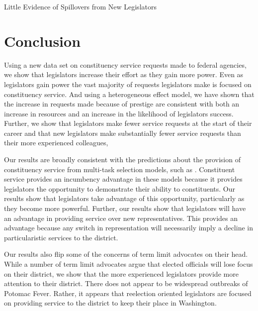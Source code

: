 \documentclass[12pt]{article}
\begin{document}
   

\begin{table}[hbt!]
\caption{Little Evidence of Spillovers from New Legislators} \label{t:spill1}

\begin{minipage}{\textwidth}
\begin{center}

\end{center}
\end{minipage}
\end{table}


\section{Conclusion} \label{s:conclude}

Using a new data set on constituency service requests made to federal agencies, we show that legislators increase their effort as they gain more power. Even as legislators gain power the vast majority of requests legislators make is focused on constituency service. And using a heterogeneous effect model, we have shown that the increase in requests made because of prestige are consistent with both an increase in resources and an increase in the likelihood of legislators success. Further, we show that legislators make fewer service requests at the start of their career and that new legislators make substantially fewer service requests than their more experienced colleagues,  

Our results are broadly consistent with the predictions about the provision of constituency service from multi-task selection models, such as \cite{AshworthBuenodeMesquita2006}. Constituent service provides an incumbency advantage in these models because it provides legislators the opportunity to demonstrate their ability to constituents. Our results show that legislators take advantage of this opportunity, particularly as they become more powerful. Further, our results show that legislators will have an advantage in providing service over new representatives. This provides an advantage because any switch in representation will necessarily imply a decline in particularistic services to the district. 

Our results also flip some of the concerns of term limit advocates on their head. While a number of term limit advocates argue that elected officials will lose focus on their district, we show that the more experienced legislators provide more attention to their district. There does not appear to be widespread outbreaks of Potomac Fever. Rather, it appears that reelection oriented legislators are focused on providing service to the district to keep their place in Washington.  
\end{document}
